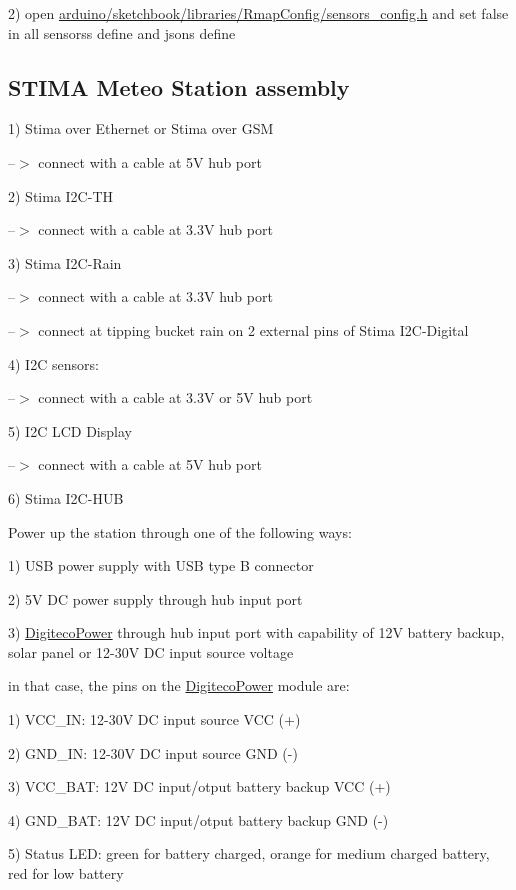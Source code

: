 2) open \hyperlink{sensors__config_8h}{arduino/sketchbook/libraries/\+Rmap\+Config/sensors\+\_\+config.\+h} and set false in all sensors\textquotesingle{}s define and json\textquotesingle{}s define\hypertarget{index_station}{}\subsection{S\+T\+I\+M\+A Meteo Station assembly}\label{index_station}
1) Stima over Ethernet or Stima over G\+SM

--$>$ connect with a cable at 5V hub port

2) Stima I2\+C-\/\+TH

--$>$ connect with a cable at 3.\+3V hub port

3) Stima I2\+C-\/\+Rain

--$>$ connect with a cable at 3.\+3V hub port

--$>$ connect at tipping bucket rain on 2 external pins of Stima I2\+C-\/\+Digital

4) I2C sensor\textquotesingle{}s\+:

--$>$ connect with a cable at 3.\+3V or 5V hub port

5) I2C L\+CD Display

--$>$ connect with a cable at 5V hub port

6) Stima I2\+C-\/\+H\+UB

Power up the station through one of the following ways\+:

1) U\+SB power supply with U\+SB type B connector

2) 5V DC power supply through hub input port

3) \hyperlink{namespaceDigitecoPower}{Digiteco\+Power} through hub input port with capability of 12V battery backup, solar panel or 12-\/30V DC input source voltage

in that case, the pins on the \hyperlink{namespaceDigitecoPower}{Digiteco\+Power} module are\+:

1) V\+C\+C\+\_\+\+IN\+: 12-\/30V DC input source V\+CC (+)

2) G\+N\+D\+\_\+\+IN\+: 12-\/30V DC input source G\+ND (-\/)

3) V\+C\+C\+\_\+\+B\+AT\+: 12V DC input/otput battery backup V\+CC (+)

4) G\+N\+D\+\_\+\+B\+AT\+: 12V DC input/otput battery backup G\+ND (-\/)

5) Status L\+ED\+: green for battery charged, orange for medium charged battery, red for low battery

